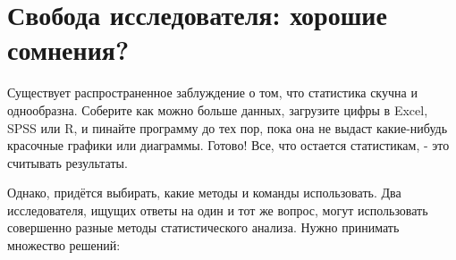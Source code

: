 \chapter{Свобода исследователя: хорошие сомнения? }
\label{chp8}

Существует распространенное заблуждение о том, что статистика скучна и однообразна. Соберите как можно больше данных, загрузите цифры в Excel, SPSS или R, и пинайте программу до тех пор, пока она не выдаст какие-нибудь красочные графики или диаграммы. Готово! Все, что остается статистикам, - это считывать результаты.

Однако, придётся выбирать, какие методы и команды использовать. Два исследователя, ищущих ответы на один и тот же вопрос, могут использовать совершенно разные методы статистического анализа. Нужно принимать множество решений:


